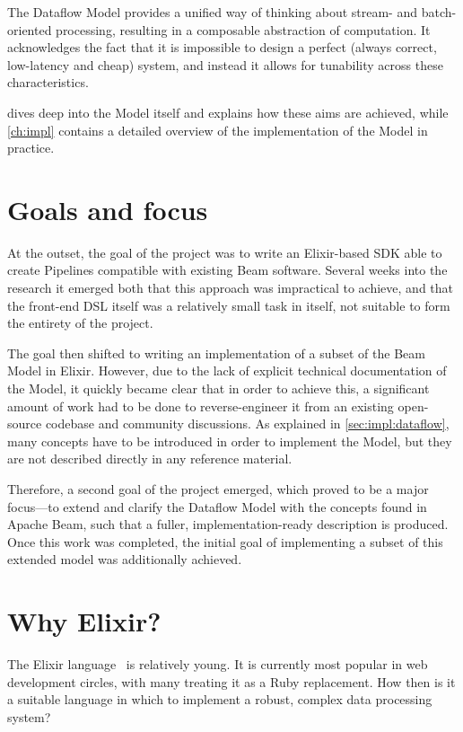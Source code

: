 The Dataflow Model provides a unified way of thinking about stream- and batch-oriented processing, resulting in a composable abstraction of computation.
It acknowledges the fact that it is impossible to design a perfect (always correct, low-latency and cheap) system, and instead it allows for tunability across these characteristics.

 dives deep into the Model itself and explains how these aims are achieved, while \cref{ch:impl} contains a detailed overview of the implementation of the Model in practice.

\section{Goals and focus}\label{sec:intro:goals}

At the outset, the goal of the project was to write an Elixir-based SDK able to create Pipelines compatible with existing Beam software.
Several weeks into the research it emerged both that this approach was impractical to achieve, and that the front-end DSL itself was a relatively small task in itself, not suitable to form the entirety of the project.

The goal then shifted to writing an implementation of a subset of the Beam Model in Elixir.
However, due to the lack of explicit technical documentation of the Model, it quickly became clear that in order to achieve this, a significant amount of work had to be done to reverse-engineer it from an existing open-source codebase and community discussions.
As explained in \cref{sec:impl:dataflow}, many concepts have to be introduced in order to implement the Model, but they are not described directly in any reference material.

Therefore, a second goal of the project emerged, which proved to be a major focus---to extend and clarify the Dataflow Model with the concepts found in Apache Beam, such that a fuller, implementation-ready description is produced.
Once this work was completed, the initial goal of implementing a subset of this extended model was additionally achieved.

\section{Why Elixir?}\label{sec:intro:elixir}

The Elixir language~\cite{Elixir} is relatively young.
It is currently most popular in web development circles, with many treating it as a Ruby replacement.
How then is it a suitable language in which to implement a robust, complex data processing system?

